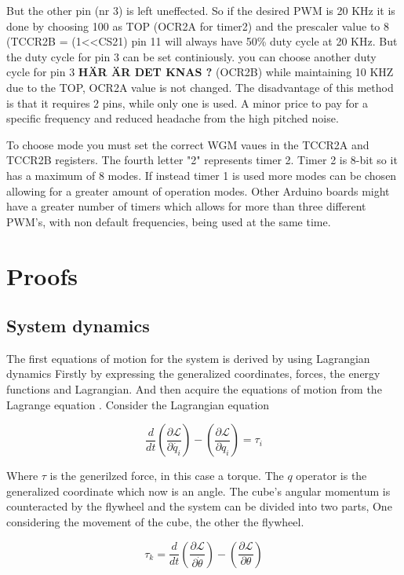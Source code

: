 \documentclass[a4paper,11pt]{kth-mag}
\begin{document}
But the other pin (nr 3) is left uneffected. So if the desired PWM is 20 KHz it is done by choosing 100 
as TOP (OCR2A for timer2) and the prescaler value to 8 (TCCR2B = (1<<CS21) pin 11 will always have 50\% duty cycle at 20 KHz. But the duty cycle for pin 3 can be set continiously.  you can choose another duty cycle for pin 3  \textbf{HÄR ÄR DET KNAS ?}
(OCR2B) while maintaining 10 KHZ due to the TOP, OCR2A value is not changed. The disadvantage of this method is that it requires 2 pins, while only one is used. A minor price to pay for a specific frequency and reduced headache from the high pitched noise.

To choose mode you must set the correct WGM vaues in the TCCR2A and TCCR2B registers. The fourth letter "2" represents timer 2. Timer 2 is 8-bit so it has a maximum of 8 modes. If instead timer 1 is 
used more modes can be chosen allowing for a greater amount of operation modes. Other Arduino boards might have a greater number of timers which allows for more than three different PWM's, with non default frequencies, being used at the same time.

\chapter{Proofs} \label{appB}

\section{System dynamics} \label{app: system dyn}
The first equations of motion for the system is derived by using Lagrangian dynamics Firstly by expressing the generalized coordinates, forces, the energy functions and Lagrangian. And then acquire the equations of motion from the Lagrange equation  \cite{Lagrangeref}. Consider the Lagrangian equation

\begin{equation}
\frac{d}{dt}\left(\frac{\partial \mathcal{L}}{\partial \dot{q_i}}\right)-\left(\frac{\partial \mathcal{L}}{\partial q_i}\right) = \tau_i
\end{equation}

Where $\tau$ is the generilzed force, in this case a torque. The $q$ operator is the generalized coordinate which now is an angle. The cube's angular momentum is counteracted by the flywheel and the system can be divided into two parts, One considering the movement of the cube, the other the flywheel.

\begin{equation} \label{eq:positiveL}
\tau_k=\frac{d}{dt}\left(\frac{\partial \mathcal{L}}{\partial \dot{\theta}}\right)-\left(\frac{\partial \mathcal{L}}{\partial \theta}\right)
\end{equation}
\end{document}
